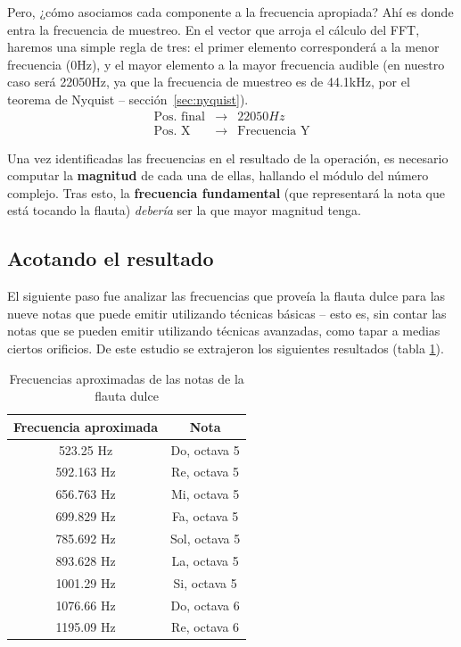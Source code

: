 Pero, ¿cómo asociamos cada componente a la frecuencia apropiada? Ahí es donde
entra la frecuencia de muestreo. En el vector que arroja el cálculo del FFT,
haremos una simple regla de tres: el primer elemento corresponderá a la menor
frecuencia (0Hz), y el mayor elemento a la mayor frecuencia audible (en nuestro
caso será 22050Hz, ya que la frecuencia de muestreo es de 44.1kHz, por el
teorema de Nyquist -- sección~\ref{sec:nyquist}).
$$
   \begin{array}{ccc}
       \textrm{Pos. final}  & \longrightarrow & 22050Hz\\
       \textrm{Pos. X} & \longrightarrow & \textrm{Frecuencia Y}
   \end{array}
$$

Una vez identificadas las frecuencias en el resultado de la operación, es
necesario computar la \textbf{magnitud} de cada una de ellas, hallando el módulo
del número complejo. Tras esto, la \textbf{frecuencia fundamental} (que
representará la nota que está tocando la flauta) \textit{debería} ser la que
mayor magnitud tenga.

\subsection{Acotando el resultado}
El siguiente paso fue analizar las frecuencias que proveía la flauta dulce para
las nueve notas que puede emitir utilizando técnicas básicas -- esto es, sin
contar las notas que se pueden emitir utilizando técnicas avanzadas, como tapar
a medias ciertos orificios. De este estudio se extrajeron los siguientes
resultados (tabla \ref{tab:frecuencias}).

\begin{table}[ht!]
  \centering
  \begin{tabular}[h]{|c|c|}
    \hline
    \textbf{Frecuencia aproximada} & \textbf{Nota} \\ \hline
    523.25 Hz & Do, octava 5\\ \hline
    592.163 Hz & Re, octava 5\\ \hline
    656.763 Hz & Mi, octava 5\\ \hline
    699.829 Hz & Fa, octava 5\\ \hline
    785.692 Hz & Sol, octava 5\\ \hline
    893.628 Hz & La, octava 5\\ \hline
    1001.29 Hz & Si, octava 5\\ \hline
    1076.66 Hz & Do, octava 6 \\ \hline
    1195.09 Hz & Re, octava 6 \\ \hline
  \end{tabular}
  \caption{Frecuencias aproximadas de las notas de la flauta dulce}
  \label{tab:frecuencias}
\end{table}

